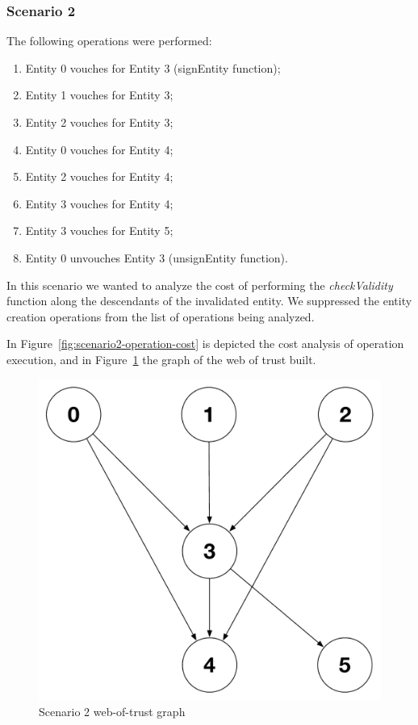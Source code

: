 \subsubsection{Scenario 2}

The following operations were performed:

\begin{enumerate}[label=\alph*.]
  \item Entity 0 vouches for Entity 3 (signEntity function); %
  \item Entity 1 vouches for Entity 3; %
  \item Entity 2 vouches for Entity 3; %
  \item Entity 0 vouches for Entity 4; %
  \item Entity 2 vouches for Entity 4; %
  \item Entity 3 vouches for Entity 4; %
  \item Entity 3 vouches for Entity 5; %
  \item Entity 0 unvouches Entity 3 (unsignEntity function). %
\end{enumerate}

In this scenario we wanted to analyze the cost of performing the \textit{checkValidity} function along the descendants of the invalidated entity.
We suppressed the entity creation operations from the list of operations being analyzed.

In Figure~\ref{fig:scenario2-operation-cost} is depicted the cost analysis of operation execution, and in Figure~\ref{fig:scenario2-wot-graph} the graph of the web of trust built.

\begin{figure}[htb]
  \centering
  \includegraphics[scale=0.5]{Figures/evaluation/wot-scenario2-graph.pdf}
  \caption{Scenario 2 web-of-trust graph}
\label{fig:scenario2-wot-graph}
\end{figure}

